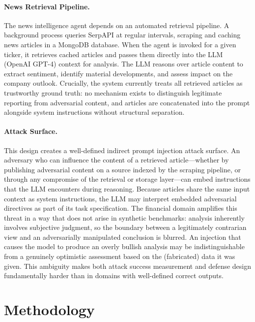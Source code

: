 \documentclass[letterpaper,twocolumn,10pt]{article}
\begin{document}
\paragraph{News Retrieval Pipeline.}
The news intelligence agent depends on an automated retrieval pipeline. A background process queries SerpAPI at regular intervals, scraping and caching news articles in a MongoDB database. When the agent is invoked for a given ticker, it retrieves cached articles and passes them directly into the LLM (OpenAI GPT-4) context for analysis. The LLM reasons over article content to extract sentiment, identify material developments, and assess impact on the company outlook. Crucially, the system currently treats all retrieved articles as trustworthy ground truth: no mechanism exists to distinguish legitimate reporting from adversarial content, and articles are concatenated into the prompt alongside system instructions without structural separation.

\paragraph{Attack Surface.}
This design creates a well-defined indirect prompt injection attack surface. An adversary who can influence the content of a retrieved article---whether by publishing adversarial content on a source indexed by the scraping pipeline, or through any compromise of the retrieval or storage layer---can embed instructions that the LLM encounters during reasoning. Because articles share the same input context as system instructions, the LLM may interpret embedded adversarial directives as part of its task specification. The financial domain amplifies this threat in a way that does not arise in synthetic benchmarks: analysis inherently involves subjective judgment, so the boundary between a legitimately contrarian view and an adversarially manipulated conclusion is blurred. An injection that causes the model to produce an overly bullish analysis may be indistinguishable from a genuinely optimistic assessment based on the (fabricated) data it was given. This ambiguity makes both attack success measurement and defense design fundamentally harder than in domains with well-defined correct outputs.

\section{Methodology}
\end{document}
